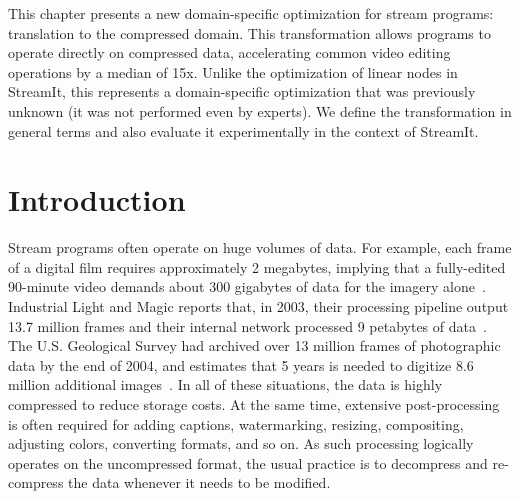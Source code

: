 \newcommand{\x}{\hspace{1.3pt}} %

\label{chap:compression}


This chapter presents a new domain-specific optimization for stream
programs: translation to the compressed domain.  This transformation
allows programs to operate directly on compressed data, accelerating
common video editing operations by a median of 15x.  Unlike the
optimization of linear nodes in StreamIt, this represents a
domain-specific optimization that was previously unknown (it was not
performed even by experts).  We define the transformation in general
terms and also evaluate it experimentally in the context of StreamIt.

\section{Introduction}

Stream programs often operate on huge volumes of data.  For example,
each frame of a digital film requires approximately 2 megabytes,
implying that a fully-edited 90-minute video demands about 300
gigabytes of data for the imagery alone~\cite{ibm-video}.  Industrial
Light and Magic reports that, in 2003, their processing pipeline
output 13.7 million frames and their internal network processed 9
petabytes of data~\cite{ilm-interview}.  The U.S. Geological Survey
had archived over 13 million frames of photographic data by the end of
2004, and estimates that 5 years is needed to digitize 8.6 million
additional images~\cite{usgs}.  In all of these situations, the data
is highly compressed to reduce storage costs.  At the same time,
extensive post-processing is often required for adding captions,
watermarking, resizing, compositing, adjusting colors, converting
formats, and so on.  As such processing logically operates on the
uncompressed format, the usual practice is to decompress and
re-compress the data whenever it needs to be modified.

